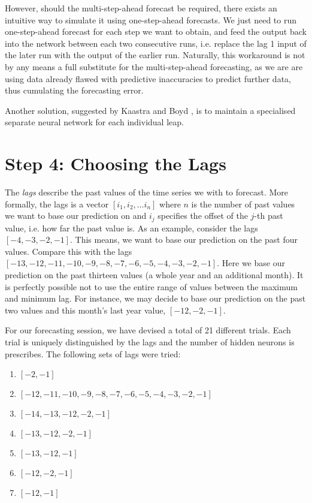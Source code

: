 However, should the multi-step-ahead forecast be required, there exists an intuitive way to simulate it using one-step-ahead forecasts. We just need to run one-step-ahead forecast for each step we want to obtain, and feed the output back into the network between each two consecutive runs, i.e. replace the lag 1 input of the later run with the output of the earlier run. Naturally, this workaround is not by any means a full substitute for the multi-step-ahead forecasting, as we are are using data already flawed with predictive inaccuracies to predict further data, thus cumulating the forecasting error.

Another solution, suggested by Kaastra and Boyd \cite{Kaastra95}, is to maintain a specialised separate neural network for each individual leap.

\section{Step 4: Choosing the Lags}

The \textit{lags} describe the past values of the time series we with to forecast. More formally, the lags is a vector $ [i_1, i_2, \ldots i_n ]$ where $ n $ is the number of past values we want to base our prediction on and $ i_j $ specifies the offset of the $ j $-th past value, i.e. how far the past value is. As an example, consider the lags $ [ -4, -3, -2, -1 ] $. This means, we want to base our prediction on the past four values. Compare this with the lags\\
$ [ -13, -12, -11, -10, -9, -8, -7, -6, -5, -4, -3 , -2, -1 ] $. Here we base our prediction on the past thirteen values (a whole year and an additional month). It is perfectly possible not to use the entire range of values between the maximum and minimum lag. For instance, we may decide to base our prediction on the past two values and this month's last year value, $ [ -12, -2, -1 ] $.

For our forecasting session, we have devised a total of 21 different trials. Each trial is uniquely distinguished by the lags and the number of hidden neurons is prescribes. The following sets of lags were tried:

\begin{enumerate}
\item $ [ -2, - 1 ] $  
\item $ [ -12, -11, -10, -9, -8, -7, -6, -5, -4, -3, -2, -1 ] $
\item $ [ -14, -13, -12, -2, -1 ] $
\item $ [ -13, -12, -2, -1 ] $
\item $ [ -13, -12, -1 ] $
\item $ [ -12, -2, -1 ] $
\item $ [ -12, -1 ] $
\end{enumerate}

